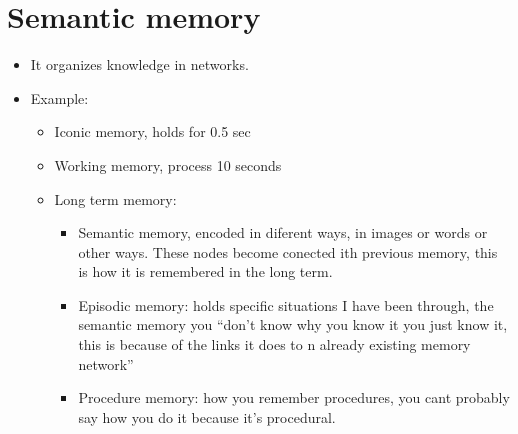 \section{Semantic memory}
\begin{itemize}
    \item It organizes knowledge in networks.
    \item Example: 
        \begin{itemize}
            \item Iconic memory, holds for 0.5 sec 
            \item Working memory, process 10 seconds 
            
            \item Long term memory: 
            \begin{itemize}
                \item Semantic memory, encoded in diferent ways, in images or words or other ways. These nodes become conected ith previous memory, this is how it is remembered in the long term.
                \item Episodic memory: holds specific situations I have been through, the semantic memory you ``don't know why you know it you just know it, this is because of the links it does to n already existing memory network'' 
                \item Procedure memory: how you remember procedures, you cant probably say how you do it because it's procedural.
            \end{itemize}
        \end{itemize}
    

\end{itemize}
